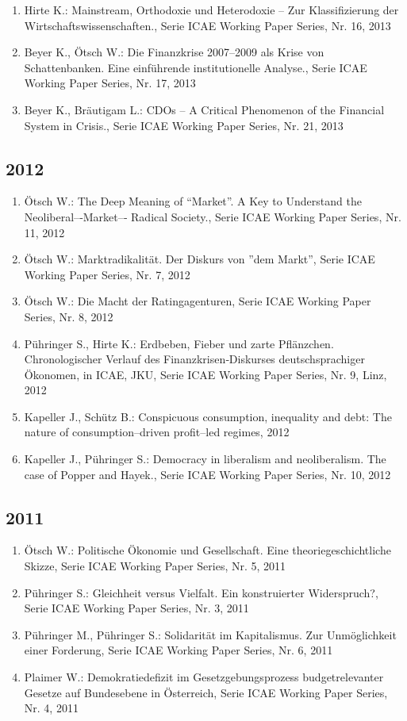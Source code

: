\begin{enumerate}
	 \item Hirte K.: Mainstream, Orthodoxie und Heterodoxie -- Zur Klassifizierung der Wirtschaftswissenschaften., Serie ICAE Working Paper Series, Nr. 16, 2013
	 \item Beyer K., Ötsch W.: Die Finanzkrise 2007--2009 als Krise von Schattenbanken. Eine einführende institutionelle Analyse., Serie ICAE Working Paper Series, Nr. 17, 2013
	 \item Beyer K., Bräutigam L.: CDOs – A Critical Phenomenon of the Financial System in Crisis., Serie ICAE Working Paper Series, Nr. 21, 2013
\end{enumerate}
\subsection*{2012}
\begin{enumerate}
    	 \item Ötsch W.: The Deep Meaning of “Market”. A Key to Understand the Neoliberal--­‐Market--­‐ Radical Society., Serie ICAE Working Paper Series, Nr. 11, 2012
	 \item Ötsch W.: Marktradikalität. Der Diskurs von ''dem Markt'', Serie ICAE Working Paper Series, Nr. 7, 2012
	 \item Ötsch W.: Die Macht der Ratingagenturen, Serie ICAE Working Paper Series, Nr. 8, 2012
	 \item Pühringer S., Hirte K.: Erdbeben, Fieber und zarte Pflänzchen. Chronologischer Verlauf des Finanzkrisen‐Diskurses deutschsprachiger Ökonomen, in ICAE, JKU, Serie ICAE Working Paper Series, Nr. 9, Linz, 2012
	 \item Kapeller J., Schütz B.: Conspicuous consumption, inequality and debt: The nature of consumption--driven profit--led regimes, 2012
	 \item Kapeller J., Pühringer S.: Democracy in liberalism and neoliberalism. The case of Popper and Hayek., Serie ICAE Working Paper Series, Nr. 10, 2012
\end{enumerate}
\subsection*{2011}
\begin{enumerate}
    	 \item Ötsch W.: Politische Ökonomie und Gesellschaft. Eine theoriegeschichtliche Skizze, Serie ICAE Working Paper Series, Nr. 5, 2011
	 \item Pühringer S.: Gleichheit versus Vielfalt. Ein konstruierter Widerspruch?, Serie ICAE Working Paper Series, Nr. 3, 2011
	 \item Pühringer M., Pühringer S.: Solidarität im Kapitalismus. Zur Unmöglichkeit einer Forderung, Serie ICAE Working Paper Series, Nr. 6, 2011
	 \item Plaimer W.: Demokratiedefizit im Gesetzgebungsprozess budgetrelevanter Gesetze auf Bundesebene in Österreich, Serie ICAE Working Paper Series, Nr. 4, 2011
\end{enumerate}
